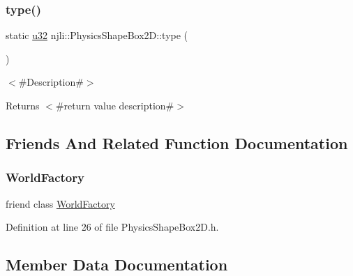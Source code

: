 \subsubsection{\texorpdfstring{type()}{type()}}
{\footnotesize\ttfamily static \mbox{\hyperlink{_util_8h_a10e94b422ef0c20dcdec20d31a1f5049}{u32}} njli\+::\+Physics\+Shape\+Box2\+D\+::type (\begin{DoxyParamCaption}{ }\end{DoxyParamCaption})\hspace{0.3cm}{\ttfamily [static]}}

$<$\#\+Description\#$>$

\begin{DoxyReturn}{Returns}
$<$\#return value description\#$>$ 
\end{DoxyReturn}


\subsection{Friends And Related Function Documentation}
\mbox{\label{classnjli_1_1_physics_shape_box2_d_acb96ebb09abe8f2a37a915a842babfac}} 
\subsubsection{\texorpdfstring{World\+Factory}{WorldFactory}}
{\footnotesize\ttfamily friend class \mbox{\hyperlink{classnjli_1_1_world_factory}{World\+Factory}}\hspace{0.3cm}{\ttfamily [friend]}}



Definition at line 26 of file Physics\+Shape\+Box2\+D.\+h.



\subsection{Member Data Documentation}
\mbox{\label{classnjli_1_1_physics_shape_box2_d_a3e946790bb7d72f91faf88224d88ca72}} 
